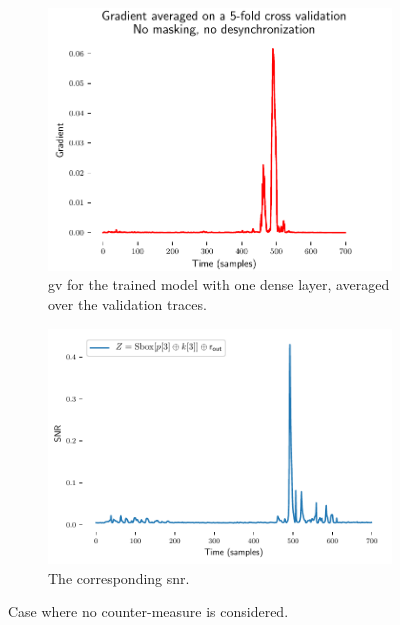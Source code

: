 \begin{figure}
    \centering
    \begin{subfigure}{0.49 \textwidth}
        \includegraphics[width=\textwidth]{figures/ASCAD_700/no_mask_no_desynchro/VBP_n_dense_1_mean_review}
        \caption{\gls{gv} for the trained model with one dense layer, averaged over the validation traces.}
        \label{fig:no_mask_no_desynchro_gv}
    \end{subfigure}
    \begin{subfigure}{0.49 \textwidth}
        \includegraphics[width=\textwidth]{figures/ASCAD_700/snr_ascad_unmasked}
        \caption{The corresponding \gls{snr}.}
        \label{fig:no_mask_no_desynchro_snr}
    \end{subfigure}
	\caption{Case where no counter-measure is considered.}
    \label{fig:no_mask_no_desynchro}
\end{figure}
